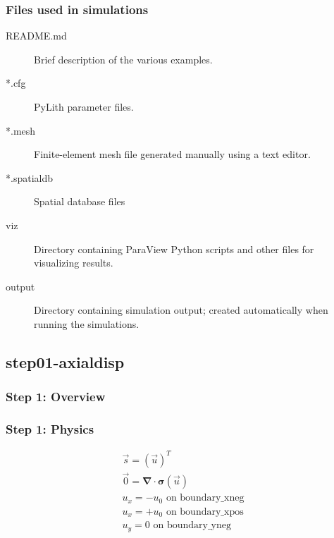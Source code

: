 \documentclass[aspectratio=169]{beamer}
\begin{document}
\begin{frame}
  \frametitle{Files used in simulations}

  \begin{description}
  \item[README.md] Brief description of the various examples.
  \item[*.cfg] PyLith parameter files.
  \item[*.mesh] Finite-element mesh file generated manually using a text editor.
  \item[*.spatialdb] Spatial database files
  \item[viz] Directory containing ParaView Python scripts and other files for visualizing results.
  \item[output] Directory containing simulation output; created automatically when running the simulations.
  \end{description}

\end{frame}
  

\subsection{step01-axialdisp}

\begin{frame}
  \frametitle{Step 1: Overview}

      
\end{frame}


\begin{frame}
  \frametitle{Step 1: Physics}
  \summary{}

  \begin{minipage}{0.35\textwidth}
    {\scriptsize
    \begin{gather*}
      \vec{s} = \left( \vec{u} \right)^T \\
      \vec{0} = \boldsymbol{\nabla} \cdot \boldsymbol{\sigma}(\vec{u}) \\
      u_x = -u_0 \text{ on boundary\_xneg} \\
      u_x = +u_0 \text{ on boundary\_xpos} \\
      u_y = 0 \text{ on boundary\_yneg}
    \end{gather*}}
  \end{minipage}
  \hfill
  \begin{minipage}{0.55\textwidth}
  \end{minipage}
      
\end{frame}
\end{document}
